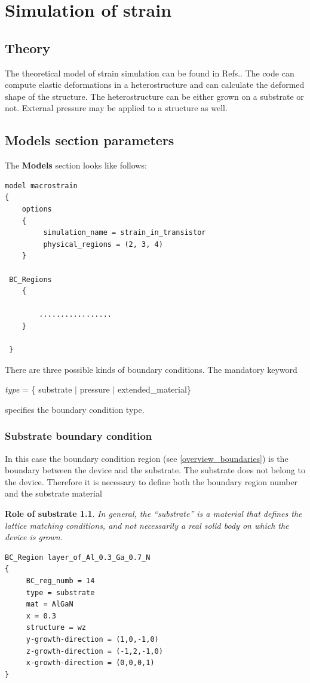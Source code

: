\chapter{Simulation of strain}
\label{chap:strain}
\section{Theory}
The theoretical model of strain simulation can be found in Refs.\cite{strain1, strain2}. The code can compute elastic deformations in a heterostructure and can calculate the deformed shape of the structure. The heterostructure can be either grown on a substrate or not. External pressure may be applied to a structure as well.
\section{Models section parameters}
The {\bf Models} section looks like follows:
\begin{verbatim}
model macrostrain
{
    options
    {
         simulation_name = strain_in_transistor
         physical_regions = (2, 3, 4)
    }

 BC_Regions  
    {

        .................
    }

 }
\end{verbatim}
There are three possible kinds of boundary conditions.
The mandatory keyword 

\textit{type} = \{ substrate $\vert$ pressure $\vert$ extended\_material\} 

specifies the boundary condition type.

\subsection{Substrate boundary condition}
In this case the boundary condition region (see \ref{overview_boundaries}) is the boundary between the device and the substrate. The substrate does not belong to the device. Therefore it is necessary to define 
both the boundary region number and the substrate material

\newtheorem*{subst}{Role of substrate}
\begin{subst}
 In general, the ``substrate'' is a material that defines the lattice matching
 conditions, and not necessarily a real solid body on which the device is grown.
\end{subst}

\begin{verbatim}
BC_Region layer_of_Al_0.3_Ga_0.7_N
{
     BC_reg_numb = 14
     type = substrate
     mat = AlGaN
     x = 0.3
     structure = wz
     y-growth-direction = (1,0,-1,0)
     z-growth-direction = (-1,2,-1,0)
     x-growth-direction = (0,0,0,1)
}
\end{verbatim}


